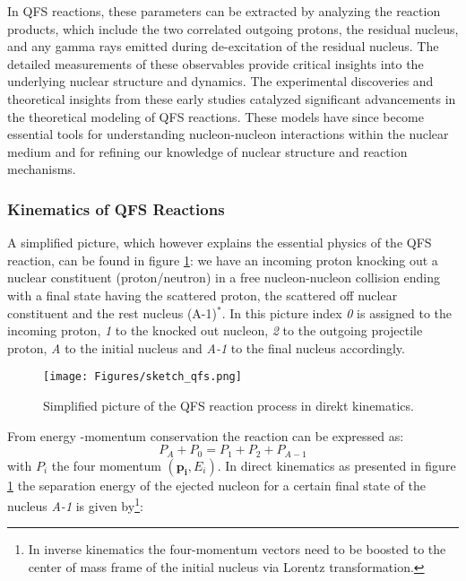 In QFS reactions, these parameters can be extracted by analyzing the reaction products, which include the two correlated outgoing protons, the residual nucleus, and any gamma rays emitted during de-excitation of the residual nucleus. The detailed measurements of these observables provide critical insights into the underlying nuclear structure and dynamics.\newline
The experimental discoveries and theoretical insights from these early studies catalyzed significant advancements in the theoretical modeling of QFS reactions. These models have since become essential tools for understanding nucleon-nucleon interactions within the nuclear medium and for refining our knowledge of nuclear structure and reaction mechanisms.\newline
\subsubsection{Kinematics of QFS Reactions}\label{sec:kin_qfs}
A simplified picture, which however explains the essential physics of the QFS reaction, can be found in figure \ref{fig:sketch_qfs}: we have an incoming proton knocking out a nuclear constituent (proton/neutron) in a free nucleon-nucleon collision ending with a final state having the scattered proton, the scattered  off nuclear constituent and the rest nucleus (A-1)$^*$. In this picture index \textit{0} is assigned to the incoming proton, \textit{1} to the knocked out nucleon, \textit{2} to the outgoing projectile proton, \textit{A} to the initial nucleus and  \textit{A-1} to the final nucleus accordingly.
\begin{figure}[htpb]
    \centering
    \texttt{[image: Figures/sketch\_qfs.png]}
    \caption{
   	Simplified picture of the QFS reaction process in direkt kinematics.  
    }
    \label{fig:sketch_qfs}
\end{figure}
From energy -momentum conservation the reaction can be expressed as:
\begin{equation}\label{eq:four_mom_cons_qfs}
P_A  +  P_0 = P_1 + P_2 +P_{A-1} 
\end{equation}
with $P_i$ the four momentum $(\mathbf{p_i},E_i)$.\newline
In direct kinematics as presented in figure \ref{fig:sketch_qfs} the separation energy  of the ejected nucleon for a certain final state of the nucleus \textit{A-1} is given by\footnote{In inverse kinematics the four-momentum vectors need to be boosted to the center of mass frame of the initial nucleus via Lorentz transformation.}:
